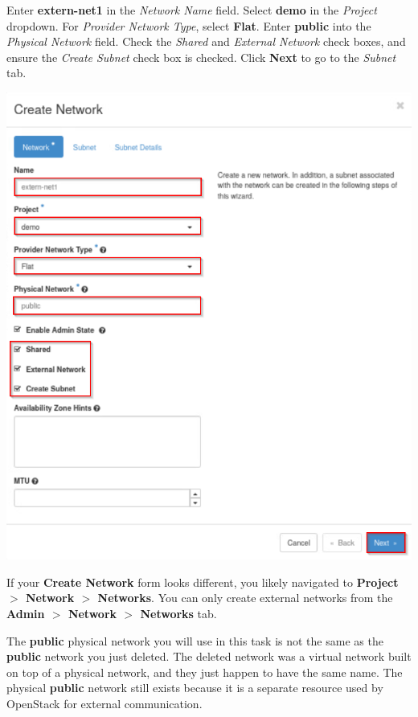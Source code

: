 \documentclass[letterpaper, 12pt]{article}
\begin{document}
\begin{enumerate}
    \begin{labstep}
        Enter \textbf{extern-net1} in the \textit{Network Name} field.
        Select \textbf{demo} in the \textit{Project} dropdown.
        For \textit{Provider Network Type}, select \textbf{Flat}.
        Enter \textbf{public} into the \textit{Physical Network} field.
        Check the \textit{Shared} and \textit{External Network} check boxes, and ensure the \textit{Create Subnet} check box is checked.
        Click \textbf{Next} to go to the \textit{Subnet} tab.

        \begin{center}
            \includegraphics[width=\linewidth]{images/part1/step7.png}
        \end{center}
    \end{labstep}

    \begin{tipbox}
        If your \textbf{Create Network} form looks different, you likely navigated to \textbf{Project $>$ Network $>$ Networks}.
        You can only create external networks from the \textbf{Admin $>$ Network $>$ Networks} tab.
    \end{tipbox}
    \begin{notebox}
        The \textbf{public} physical network you will use in this task is not the same as the \textbf{public} network you just deleted.
        The deleted network was a virtual network built on top of a physical network, and they just happen to have the same name.
        The physical \textbf{public} network still exists because it is a separate resource used by OpenStack for external communication.
    \end{notebox}


\end{enumerate}
\end{document}
